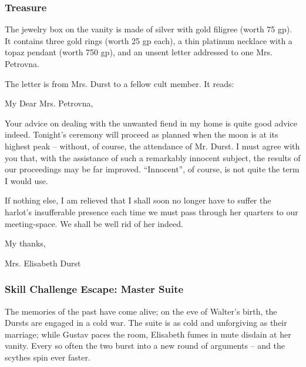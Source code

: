 \subsubsection*{Treasure}
\begin{readout}
  The jewelry box on the vanity is made of silver with gold filigree (worth 75 gp). It contains three gold rings
  (worth 25 gp each), a thin platinum necklace with a topaz pendant (worth 750 gp), and an unsent letter
  addressed to one Mrs. Petrovna.
\end{readout}
The letter is from Mrs. Durst to a fellow cult member. It reads:
\begin{handout}
  My Dear Mrs. Petrovna,
  
  Your advice on dealing with the unwanted fiend in my home is quite good advice indeed. Tonight's ceremony
  will proceed as planned when the moon is at its highest peak -- without, of course, the attendance of
  Mr. Durst. I must agree with you that, with the assistance of such a remarkably innocent subject, the results
  of our proceedings may be far improved. ``Innocent'', of course, is not quite the term I would use.
  
  If nothing else, I am relieved that I shall soon no longer have to suffer the harlot's insufferable presence
  each time we must pass through her quarters to our meeting-space. We shall be well rid of her indeed.
  
  My thanks,
  
  Mrs. Elisabeth Durst
\end{handout}

\begin{arealinks}
\end{arealinks}

\subsubsection*{Skill Challenge Escape: Master Suite}
\label{sec:SC_MasterSuite}
The memories of the past have come alive; on the eve of Walter's birth, the Dursts are engaged in a cold war.
The suite is as cold and unforgiving as their marriage; while Gustav paces the room, Elisabeth fumes in mute
disdain at her vanity. Every so often the two burst into a new round of arguments -- and the scythes spin ever
faster.

